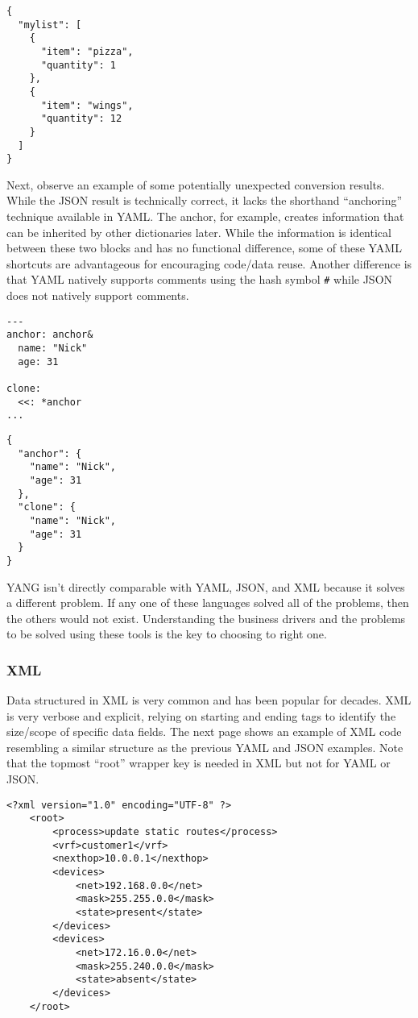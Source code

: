 \begin{verbatim}
{
  "mylist": [
    {
      "item": "pizza",
      "quantity": 1
    },
    {
      "item": "wings",
      "quantity": 12
    }
  ]
}
\end{verbatim}

Next, observe an example of some potentially unexpected conversion results.
While the JSON result is technically correct, it lacks the shorthand
``anchoring'' technique available in YAML. The anchor, for example, creates
information that can be inherited by other dictionaries later. While the
information is identical between these two blocks and has no functional
difference, some of these YAML shortcuts are advantageous for encouraging
code/data reuse. Another difference is that YAML natively supports comments
using the hash symbol \verb|#| while JSON does not natively support comments.

\begin{verbatim}
---
anchor: anchor&
  name: "Nick"
  age: 31

clone:
  <<: *anchor
...
\end{verbatim}

\begin{verbatim}
{
  "anchor": {
    "name": "Nick",
    "age": 31
  },
  "clone": {
    "name": "Nick",
    "age": 31
  }
}
\end{verbatim}

YANG isn’t directly comparable with YAML, JSON, and XML because it solves a
different problem. If any one of these languages solved all of the problems,
then the others would not exist. Understanding the business drivers and the
problems to be solved using these tools is the key to choosing to right one.

\subsubsection{XML}
Data structured in XML is very common and has been popular for decades. XML is
very verbose and explicit, relying on starting and ending tags to identify the
size/scope of specific data fields. The next page shows an example of XML code
resembling a similar structure as the previous YAML and JSON examples. Note
that the topmost ``root'' wrapper key is needed in XML but not for YAML or JSON.

\begin{verbatim}
<?xml version="1.0" encoding="UTF-8" ?>
	<root>
		<process>update static routes</process>
		<vrf>customer1</vrf>
		<nexthop>10.0.0.1</nexthop>
		<devices>
			<net>192.168.0.0</net>
			<mask>255.255.0.0</mask>
			<state>present</state>
		</devices>
		<devices>
			<net>172.16.0.0</net>
			<mask>255.240.0.0</mask>
			<state>absent</state>
		</devices>
	</root>
\end{verbatim}
